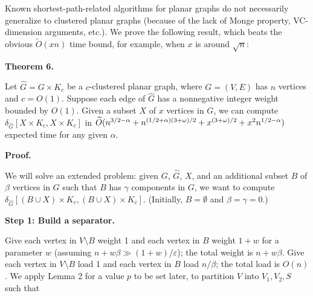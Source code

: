 \documentclass[10pt,a4paper]{article}
\begin{document}
Known shortest-path-related algorithms for planar graphs do not necessarily generalize to clustered planar graphs (because of the lack of Monge property, VC-dimension arguments, etc.). We prove the following result, which beats the obvious $\widetilde{O}(xn)$ time bound, for example, when $x$ is around $\sqrt{n}$:
\par
\par
\par\medskip\noindent\textbf{Theorem 6.}\par
Let ${\widehat{G}}=G\times K_{c}$ be a $c$-clustered planar graph, where $G=(V,E)$ has $n$ vertices and $c=O(1)$. Suppose each edge of ${\widehat{G}}$ has a nonnegative integer weight bounded by $O(1)$. Given a subset $X$ of $x$ vertices in $G$, we can compute $\delta_{\widehat{G}}[X\times K_{c},X\times K_{c}]$ in $\widetilde{O}(n^{3/2-\alpha}+n^{(1/2+\alpha)(3+\omega)/2}+x^{(3+\omega)/2}+x^{%
2}n^{1/2-\alpha})$ expected time for any given $\alpha$.
\par
\par
\par
\par\medskip\noindent\textbf{Proof.}\par
We will solve an extended problem: given $G$, ${\widehat{G}}$, $X$, and an additional subset $B$ of $\beta$ vertices in $G$ such that $B$ has $\gamma$ components in $G$, we want to compute $\delta_{\widehat{G}}[(B\cup X)\times K_{c},(B\cup X)\times K_{c}]$. (Initially, $B=\emptyset$ and $\beta=\gamma=0$.)
\par
\par
\par\medskip\noindent\textbf{Step 1: Build a separator.}\par
Give each vertex in $V\setminus B$ weight 1 and each vertex in $B$ weight $1+w$ for a parameter $w$ (assuming $n+w\beta\gg(1+w)/\varepsilon$); the total weight is $n+w\beta$. Give each vertex in $V\setminus B$ load 1 and each vertex in $B$ load $n/\beta$; the total load is $O(n)$. We apply Lemma 2 for a value $p$ to be set later, to partition $V$ into $V_{1},V_{2},S$ such that
\par
\end{document}
